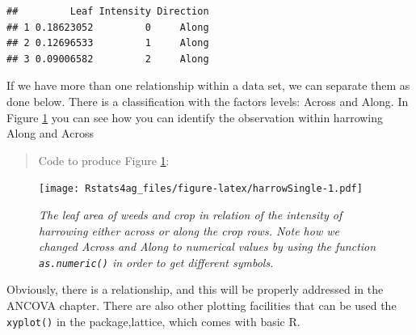\documentclass[letterpaper,]{book}
\newenvironment{Shaded}{\begin{snugshade}}{\end{snugshade}}
\newcommand{\DataTypeTok}[1]{\textcolor[rgb]{0.13,0.29,0.53}{#1}}
\newcommand{\DecValTok}[1]{\textcolor[rgb]{0.00,0.00,0.81}{#1}}
\newcommand{\FloatTok}[1]{\textcolor[rgb]{0.00,0.00,0.81}{#1}}
\newcommand{\KeywordTok}[1]{\textcolor[rgb]{0.13,0.29,0.53}{\textbf{#1}}}
\newcommand{\NormalTok}[1]{#1}
\newcommand{\OperatorTok}[1]{\textcolor[rgb]{0.81,0.36,0.00}{\textbf{#1}}}
\newcommand{\StringTok}[1]{\textcolor[rgb]{0.31,0.60,0.02}{#1}}
\begin{document}
\begin{verbatim}
##         Leaf Intensity Direction
## 1 0.18623052         0     Along
## 2 0.12696533         1     Along
## 3 0.09006582         2     Along
\end{verbatim}

If we have more than one relationship within a data set, we can separate them as done below. There is a classification with the factors levels: Across and Along. In Figure \ref{fig:harrowSingle} you can see how you can identify the observation within harrowing Along and Across

\begin{quote}
Code to produce Figure \ref{fig:harrowSingle}:
\end{quote}

\begin{Shaded}
\end{Shaded}

\begin{figure}
\centering
\texttt{[image: Rstats4ag\_files/figure-latex/harrowSingle-1.pdf]}
\caption{\label{fig:harrowSingle}\emph{The leaf area of weeds and crop in relation of the intensity of harrowing either across or along the crop rows. Note how we changed Across and Along to numerical values by using the function \texttt{as.numeric()} in order to get different symbols.}}
\end{figure}

Obviously, there is a relationship, and this will be properly addressed in the ANCOVA chapter. There are also other plotting facilities that can be used the \texttt{xyplot()} in the package,lattice, which comes with basic R.
\end{document}
